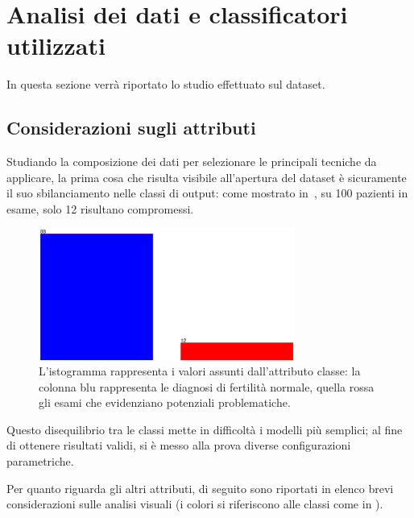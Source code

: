 \section{Analisi dei dati e classificatori utilizzati}

In questa sezione verrà riportato lo studio effettuato sul dataset.

\subsection{Considerazioni sugli attributi}

Studiando la composizione dei dati per selezionare le principali tecniche da applicare,
la prima cosa che risulta visibile all'apertura del dataset è sicuramente il suo sbilanciamento nelle classi di output:
come mostrato in~, su 100 pazienti in esame, solo 12 risultano compromessi.

\begin{figure}[H]
  \centering
  \includegraphics[width=0.75\textwidth]{fig/classes.eps}%
  \caption{%
    L'istogramma rappresenta i valori assunti dall'attributo classe:
    la colonna blu rappresenta le diagnosi di fertilità normale,
    quella rossa gli esami che evidenziano potenziali problematiche.
  }%
  \label{fig:classes}
\end{figure}

Questo disequilibrio tra le classi mette in difficoltà i modelli più semplici;
al fine di ottenere risultati validi, si è messo alla prova diverse configurazioni parametriche.

Per quanto riguarda gli altri attributi, di seguito sono riportati in elenco brevi considerazioni sulle analisi visuali (i colori si riferiscono alle classi come in ).

